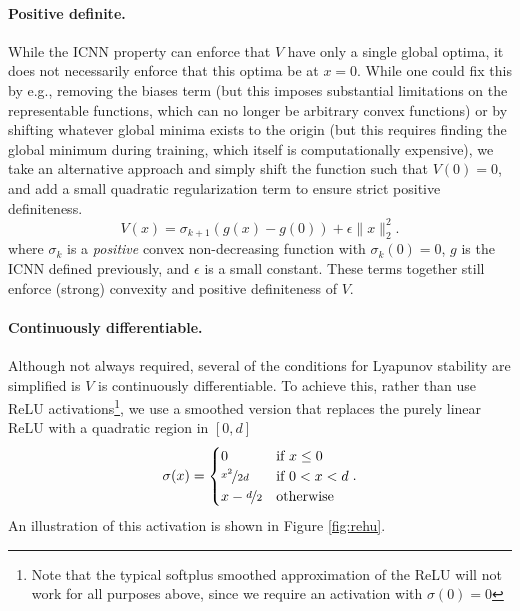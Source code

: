\paragraph{Positive definite.} While the ICNN property can enforce that $V$ have only a single global optima, it does not necessarily enforce that this optima be at $x = 0$.  While one could fix this by e.g., removing the biases term (but this imposes substantial limitations on the representable functions, which can no longer be arbitrary convex functions) or by shifting whatever global minima exists to the origin (but this requires finding the global minimum during training, which itself is computationally expensive), we take an alternative approach and simply shift the function such that $V(0) = 0$, and add a small quadratic regularization term to ensure strict positive definiteness.
\begin{equation}
    V(x) = \sigma_{k+1}(g(x) - g(0)) + \epsilon \|x\|_2^2.
    \label{eq:V_definition}
\end{equation}
where $\sigma_k$ is a \emph{positive} convex non-decreasing function with $\sigma_k(0) = 0$, $g$ is the ICNN defined previously, and $\epsilon$ is a small constant.  These terms together still enforce (strong) convexity and positive definiteness of $V$.


\paragraph{Continuously differentiable.}  Although not always required, several of the conditions for Lyapunov stability are simplified is $V$ is continuously differentiable.  To achieve this, rather than use ReLU activations\footnote{Note that the typical softplus smoothed approximation of the ReLU will not work for all purposes above, since we require an activation with $\sigma(0)=0$}, we use a smoothed version that replaces the purely linear ReLU with a quadratic region in $[0,d]$
\begin{equation}
    \sigma(x) = \begin{cases} 0                   & \mbox {if } x \leq 0 \\
              \nicefrac{x^2}{2d}  & \mbox{if } 0 < x < d \\
              x - \nicefrac{d}{2} & \mbox{otherwise}\end{cases}.
\end{equation}
An illustration of this activation is shown in Figure \ref{fig:rehu}.

